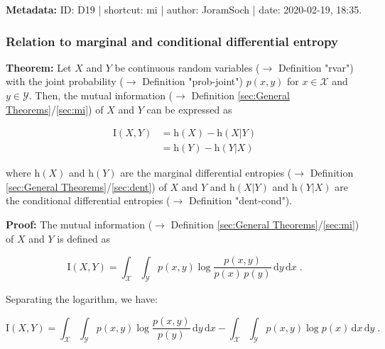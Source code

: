 \documentclass[a4paper,12pt]{book}
\begin{document}
\vspace{1em}
\textbf{Metadata:} ID: D19 | shortcut: mi | author: JoramSoch | date: 2020-02-19, 18:35.


\subsubsection[\textbf{Relation to marginal and conditional differential entropy}]{Relation to marginal and conditional differential entropy} \label{sec:cmi-mcde}

\vspace{1em}
\textbf{Theorem:} Let $X$ and $Y$ be continuous random variables ($\rightarrow$ Definition "rvar") with the joint probability ($\rightarrow$ Definition "prob-joint") $p(x,y)$ for $x \in \mathcal{X}$ and $y \in \mathcal{Y}$. Then, the mutual information ($\rightarrow$ Definition \ref{sec:General Theorems}/\ref{sec:mi}) of $X$ and $Y$ can be expressed as

\begin{equation} \label{eq:cmi-mcde-cmi-mcde}
\begin{split}
\mathrm{I}(X,Y) &= \mathrm{h}(X) - \mathrm{h}(X|Y) \\
&= \mathrm{h}(Y) - \mathrm{h}(Y|X)
\end{split}
\end{equation}

where $\mathrm{h}(X)$ and $\mathrm{h}(Y)$ are the marginal differential entropies ($\rightarrow$ Definition \ref{sec:General Theorems}/\ref{sec:dent}) of $X$ and $Y$ and $\mathrm{h}(X \vert Y)$ and $\mathrm{h}(Y \vert X)$ are the conditional differential entropies ($\rightarrow$ Definition "dent-cond").


\vspace{1em}
\textbf{Proof:} The mutual information ($\rightarrow$ Definition \ref{sec:General Theorems}/\ref{sec:mi}) of $X$ and $Y$ is defined as

\begin{equation} \label{eq:cmi-mcde-MI}
\mathrm{I}(X,Y) = \int_{\mathcal{X}} \int_{\mathcal{Y}} p(x,y) \log \frac{p(x,y)}{p(x)\,p(y)} \, \mathrm{d}y \, \mathrm{d}x \; .
\end{equation}

Separating the logarithm, we have:

\begin{equation} \label{eq:cmi-mcde-MI-s1}
\mathrm{I}(X,Y) = \int_{\mathcal{X}} \int_{\mathcal{Y}} p(x,y) \log \frac{p(x,y)}{p(y)} \, \mathrm{d}y \, \mathrm{d}x - \int_{\mathcal{X}} \int_{\mathcal{Y}} p(x,y) \log p(x) \, \mathrm{d}x \, \mathrm{d}y \; .
\end{equation}
\end{document}
